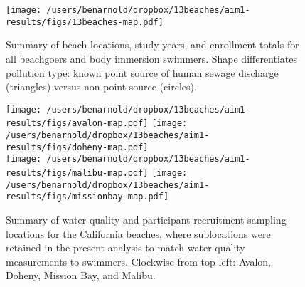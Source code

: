 \documentclass[12pt]{article}\usepackage[]{graphicx}\usepackage[]{color}
\begin{document}
\begin{landscape}
\begin{figure}
\begin{center}
\texttt{[image: /users/benarnold/dropbox/13beaches/aim1-results/figs/13beaches-map.pdf]}
\caption{Summary of beach locations, study years, and enrollment totals for all beachgoers and body immersion swimmers. Shape differentiates pollution type: known point source of human sewage discharge (triangles) versus non-point source (circles). \label{fig:beachmap}}
\end{center}
\end{figure}
\end{landscape}

\begin{figure}
\begin{center}
\texttt{[image: /users/benarnold/dropbox/13beaches/aim1-results/figs/avalon-map.pdf]}
\texttt{[image: /users/benarnold/dropbox/13beaches/aim1-results/figs/doheny-map.pdf]} \\
\texttt{[image: /users/benarnold/dropbox/13beaches/aim1-results/figs/malibu-map.pdf]}
\texttt{[image: /users/benarnold/dropbox/13beaches/aim1-results/figs/missionbay-map.pdf]}
\begin{minipage}{0.9\textwidth}
\caption{Summary of water quality and participant recruitment sampling locations for the California beaches, where sublocations were retained in the present analysis to match water quality measurements to swimmers. Clockwise from top left: Avalon, Doheny, Mission Bay, and Malibu. \label{fig:camap}}
\end{minipage}
\end{center}
\end{figure}


\end{document}
